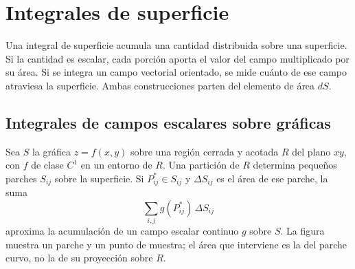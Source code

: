 \section{Integrales de superficie}

Una integral de superficie acumula una cantidad distribuida sobre una superficie. Si la cantidad es escalar, cada porción aporta el valor del campo multiplicado por su área. Si se integra un campo vectorial orientado, se mide cuánto de ese campo atraviesa la superficie. Ambas construcciones parten del elemento de área $dS$.

\subsection{Integrales de campos escalares sobre gráficas}

Sea $S$ la gráfica $z=f(x,y)$ sobre una región cerrada y acotada $R$ del plano $xy$, con $f$ de clase $C^1$ en un entorno de $R$. Una partición de $R$ determina pequeños parches $S_{ij}$ sobre la superficie. Si $P_{ij}^{*}\in S_{ij}$ y $\Delta S_{ij}$ es el área de ese parche, la suma
\[
\sum_{i,j} g(P_{ij}^{*})\,\Delta S_{ij}
\]
aproxima la acumulación de un campo escalar continuo $g$ sobre $S$. La figura muestra un parche y un punto de muestra; el área que interviene es la del parche curvo, no la de su proyección sobre $R$.

\begingroup\shorthandoff{>}
\begin{center}
\end{center}
\endgroup

